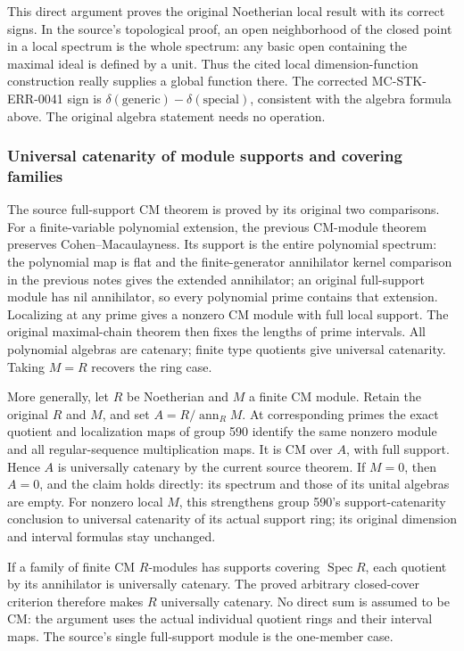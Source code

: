 This direct argument proves the original Noetherian local result with its correct signs. In the source's topological proof, an open neighborhood of the closed point in a local spectrum is the whole spectrum: any basic open containing the maximal ideal is defined by a unit. Thus the cited local dimension-function construction really supplies a global function there. The corrected MC-STK-ERR-0041 sign is \(\delta(\text{generic})-\delta(\text{special})\), consistent with the algebra formula above. The original algebra statement needs no operation.

\subsubsection{Universal catenarity of module supports and covering families}\label{universal-catenarity-of-module-supports-and-covering-families}

The source full-support CM theorem is proved by its original two comparisons. For a finite-variable polynomial extension, the previous CM-module theorem preserves Cohen--Macaulayness. Its support is the entire polynomial spectrum: the polynomial map is flat and the finite-generator annihilator kernel comparison in the previous notes gives the extended annihilator; an original full-support module has nil annihilator, so every polynomial prime contains that extension. Localizing at any prime gives a nonzero CM module with full local support. The original maximal-chain theorem then fixes the lengths of prime intervals. All polynomial algebras are catenary; finite type quotients give universal catenarity. Taking \(M=R\) recovers the ring case.

More generally, let \(R\) be Noetherian and \(M\) a finite CM module. Retain the original \(R\) and \(M\), and set \(A=R/\operatorname{ann}_R M\). At corresponding primes the exact quotient and localization maps of group 590 identify the same nonzero module and all regular-sequence multiplication maps. It is CM over \(A\), with full support. Hence \(A\) is universally catenary by the current source theorem. If \(M=0\), then \(A=0\), and the claim holds directly: its spectrum and those of its unital algebras are empty. For nonzero local \(M\), this strengthens group 590's support-catenarity conclusion to universal catenarity of its actual support ring; its original dimension and interval formulas stay unchanged.

If a family of finite CM \(R\)-modules has supports covering \(\operatorname{Spec}R\), each quotient by its annihilator is universally catenary. The proved arbitrary closed-cover criterion therefore makes \(R\) universally catenary. No direct sum is assumed to be CM: the argument uses the actual individual quotient rings and their interval maps. The source's single full-support module is the one-member case.

